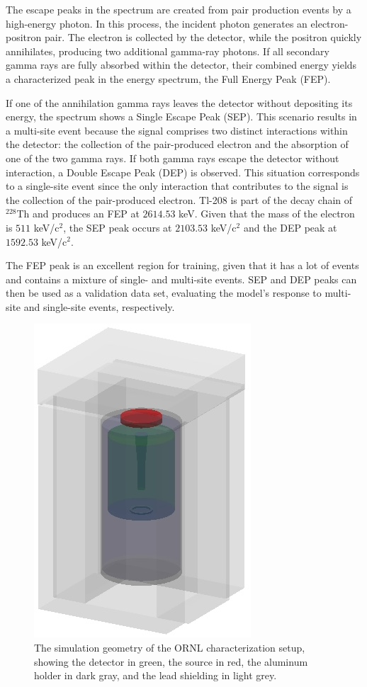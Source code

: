 The escape peaks in the spectrum are created from pair production events by a high-energy photon. In this process, the incident photon generates an electron-positron pair. The electron is collected by the detector, while the positron quickly annihilates, producing two additional gamma-ray photons. If all secondary gamma rays are fully absorbed within the detector, their combined energy yields a characterized peak in the energy spectrum, the Full Energy Peak (FEP).

If one of the annihilation gamma rays leaves the detector without depositing its energy, the spectrum shows a Single Escape Peak (SEP). This scenario results in a multi-site event because the signal comprises two distinct interactions within the detector: the collection of the pair-produced electron and the absorption of one of the two gamma rays. If both gamma rays escape the detector without interaction, a Double Escape Peak (DEP) is observed. This situation corresponds to a single-site event since the only interaction that contributes to the signal is the collection of the pair-produced electron. Tl-208 is part of the decay chain of $^{228}$Th and produces an FEP at $2614.53$ keV. Given that the mass of the electron is $511$ keV/c$^2$, the SEP peak occurs at $2103.53$ keV/c$^2$ and the DEP peak at $1592.53$ keV/c$^2$. 

The FEP peak is an excellent region for training, given that it has a lot of events and contains a mixture of single- and multi-site events. SEP and DEP peaks can then be used as a validation data set, evaluating the model's response to multi-site and single-site events, respectively.

\begin{figure}%
    \centering
    \includegraphics[width=0.4\linewidth]{ch7/figs/shielding.jpeg}
    \caption{The simulation geometry of the ORNL characterization setup, showing the detector in green, the source in red, the aluminum holder in dark gray, and the lead shielding in light grey.}
   \label{ch7_fig_g4simple_setup}
\end{figure}



